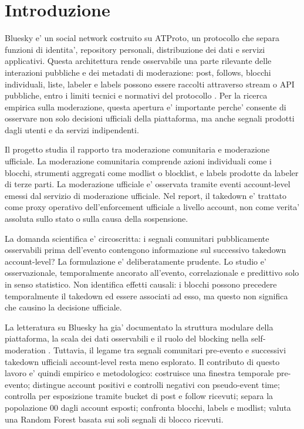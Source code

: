 \section{Introduzione}

Bluesky e' un social network costruito su ATProto, un protocollo che separa funzioni di identita', repository personali, distribuzione dei dati e servizi applicativi. Questa architettura rende osservabile una parte rilevante delle interazioni pubbliche e dei metadati di moderazione: post, follows, blocchi individuali, liste, labeler e labels possono essere raccolti attraverso stream o API pubbliche, entro i limiti tecnici e normativi del protocollo \parencite{blueskyAtprotoDocs, atprotoOverview, balduf2024looking}. Per la ricerca empirica sulla moderazione, questa apertura e' importante perche' consente di osservare non solo decisioni ufficiali della piattaforma, ma anche segnali prodotti dagli utenti e da servizi indipendenti.

Il progetto studia il rapporto tra moderazione comunitaria e moderazione ufficiale. La moderazione comunitaria comprende azioni individuali come i blocchi, strumenti aggregati come modlist o blocklist, e labels prodotte da labeler di terze parti. La moderazione ufficiale e' osservata tramite eventi account-level  emessi dal servizio di moderazione ufficiale. Nel report, il takedown e' trattato come proxy operativo dell'enforcement ufficiale a livello account, non come verita' assoluta sullo stato o sulla causa della sospensione.

La domanda scientifica e' circoscritta: i segnali comunitari pubblicamente osservabili prima dell'evento contengono informazione sul successivo takedown account-level? La formulazione e' deliberatamente prudente. Lo studio e' osservazionale, temporalmente ancorato all'evento, correlazionale e predittivo solo in senso statistico. Non identifica effetti causali: i blocchi possono precedere temporalmente il takedown ed essere associati ad esso, ma questo non significa che causino la decisione ufficiale.

La letteratura su Bluesky ha gia' documentato la struttura modulare della piattaforma, la scala dei dati osservabili e il ruolo del blocking nella self-moderation \parencite{balduf2024looking, bono2026selfmoderation, sokoto2026open}. Tuttavia, il legame tra segnali comunitari pre-evento e successivi takedown ufficiali account-level resta meno esplorato. Il contributo di questo lavoro e' quindi empirico e metodologico: costruisce una finestra temporale pre-evento; distingue account positivi e controlli negativi con pseudo-event time; controlla per esposizione tramite bucket di post e follow ricevuti; separa la popolazione 00 dagli account esposti; confronta blocchi, labels e modlist; valuta una Random Forest basata sui soli segnali di blocco ricevuti.

